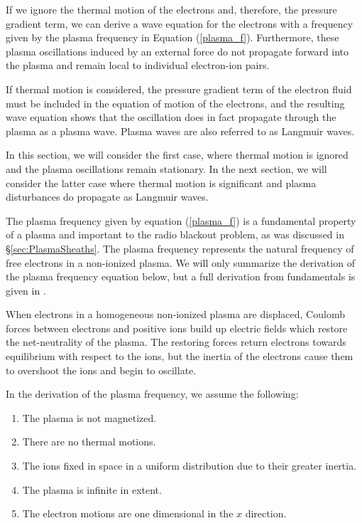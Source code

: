 \documentclass[twocolumn]{article}
\begin{document}
If we ignore the thermal motion of the electrons and, therefore, the pressure gradient term, we can derive a wave equation for the electrons with a frequency given by the plasma frequency in Equation (\ref{plasma_f}).
Furthermore, these plasma oscillations induced by an external force do not propagate forward into the plasma and remain local to individual electron-ion pairs.

If thermal motion is considered, the pressure gradient term of the electron fluid must be included in the equation of motion of the electrons, and the resulting wave equation shows that the oscillation does in fact propagate through the plasma as a plasma wave.
Plasma waves are also referred to as Langmuir waves.

In this section, we will consider the first case, where thermal motion is ignored and the plasma oscillations remain stationary.
In the next section, we will consider the latter case where thermal motion is significant and plasma disturbances do propagate as Langmuir waves.


The plasma frequency given by equation (\ref{plasma_f}) is a fundamental property of a plasma and important to the radio blackout problem, as was discussed in \S\ref{sec:PlasmaSheaths}.
The plasma frequency represents the natural frequency of free electrons in a non-ionized plasma.
We will only summarize the derivation of the plasma frequency equation below, but a full derivation from fundamentals is given in \cite{chen_introduction_1984}.

When electrons in a homogeneous non-ionized plasma are displaced, Coulomb forces between electrons and positive ions build up electric fields which restore the net-neutrality of the plasma.
The restoring forces return electrons towards equilibrium with respect to the ions, but the inertia of the electrons cause them to overshoot the ions and begin to oscillate.

In the derivation of the plasma frequency, we assume the following:
\begin{enumerate}
	\item The plasma is not magnetized.
	\item There are no thermal motions.
	\item The ions fixed in space in a uniform distribution due to their greater inertia.
	\item The plasma is infinite in extent.
	\item The electron motions are one dimensional in the $x$ direction.
\end{enumerate}
\end{document}
